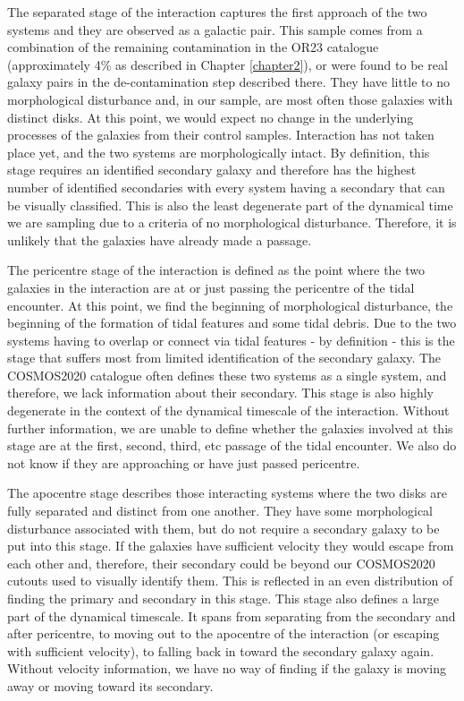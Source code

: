 The separated stage of the interaction captures the first approach of the two systems and they are observed as a galactic pair. This sample comes from a combination of the remaining contamination in the OR23 catalogue (approximately 4\% as described in Chapter \ref{chapter2}), or were found to be real galaxy pairs in the de-contamination step described there. They have little to no morphological disturbance and, in our sample, are most often those galaxies with distinct disks. At this point, we would expect no change in the underlying processes of the galaxies from their control samples. Interaction has not taken place yet, and the two systems are morphologically intact. By definition, this stage requires an identified secondary galaxy and therefore has the highest number of identified secondaries with every system having a secondary that can be visually classified. This is also the least degenerate part of the dynamical time we are sampling due to a criteria of no morphological disturbance. Therefore, it is unlikely that the galaxies have already made a passage.

The pericentre stage of the interaction is defined as the point where the two galaxies in the interaction are at or just passing the pericentre of the tidal encounter. At this point, we find the beginning of morphological disturbance, the beginning of the formation of tidal features and some tidal debris. Due to the two systems having to overlap or connect via tidal features - by definition - this is the stage that suffers most from limited identification of the secondary galaxy. The COSMOS2020 catalogue often defines these two systems as a single system, and therefore, we lack information about their secondary. This stage is also highly degenerate in the context of the dynamical timescale of the interaction. Without further information, we are unable to define whether the galaxies involved at this stage are at the first, second, third, etc passage of the tidal encounter. We also do not know if they are approaching or have just passed pericentre.

The apocentre stage describes those interacting systems where the two disks are fully separated and distinct from one another. They have some morphological disturbance associated with them, but do not require a secondary galaxy to be put into this stage. If the galaxies have sufficient velocity they would escape from each other and, therefore, their secondary could be beyond our COSMOS2020 cutouts used to visually identify them. This is reflected in an even distribution of finding the primary and secondary in this stage. This stage also defines a large part of the dynamical timescale. It spans from separating from the secondary and after pericentre, to moving out to the apocentre of the interaction (or escaping with sufficient velocity), to falling back in toward the secondary galaxy again. Without velocity information, we have no way of finding if the galaxy is moving away or moving toward its secondary.

